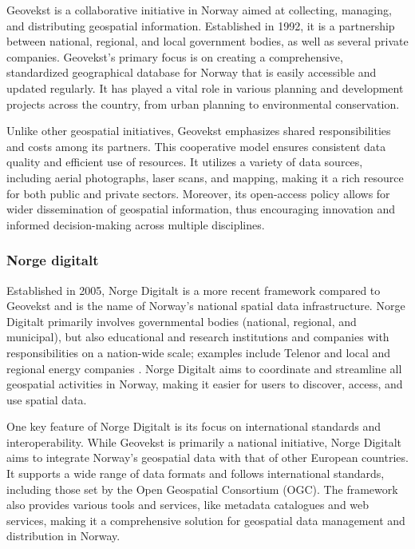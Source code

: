 Geovekst is a collaborative initiative in Norway aimed at collecting, managing, and distributing geospatial information. Established in 1992, it is a partnership between national, regional, and local government bodies, as well as several private companies. Geovekst's primary focus is on creating a comprehensive, standardized geographical database for Norway that is easily accessible and updated regularly. It has played a vital role in various planning and development projects across the country, from urban planning to environmental conservation.

Unlike other geospatial initiatives, Geovekst emphasizes shared responsibilities and costs among its partners. This cooperative model ensures consistent data quality and efficient use of resources. It utilizes a variety of data sources, including aerial photographs, laser scans, and mapping, making it a rich resource for both public and private sectors. Moreover, its open-access policy allows for wider dissemination of geospatial information, thus encouraging innovation and informed decision-making across multiple disciplines.

\subsubsection{Norge digitalt}\label{subsubsec:norge-digitalt}

Established in 2005, Norge Digitalt is a more recent framework compared to Geovekst and is the name of Norway's national spatial data infrastructure. Norge Digitalt primarily involves governmental bodies (national, regional, and municipal), but also educational and research institutions and companies with responsibilities on a nation-wide scale; examples include Telenor and local and regional energy companies \citep[6]{norgedigitaltGenerelleVilkarNorge2023}. Norge Digitalt aims to coordinate and streamline all geospatial activities in Norway, making it easier for users to discover, access, and use spatial data.

One key feature of Norge Digitalt is its focus on international standards and interoperability. While Geovekst is primarily a national initiative, Norge Digitalt aims to integrate Norway's geospatial data with that of other European countries. It supports a wide range of data formats and follows international standards, including those set by the Open Geospatial Consortium (OGC). The framework also provides various tools and services, like metadata catalogues and web services, making it a comprehensive solution for geospatial data management and distribution in Norway.

